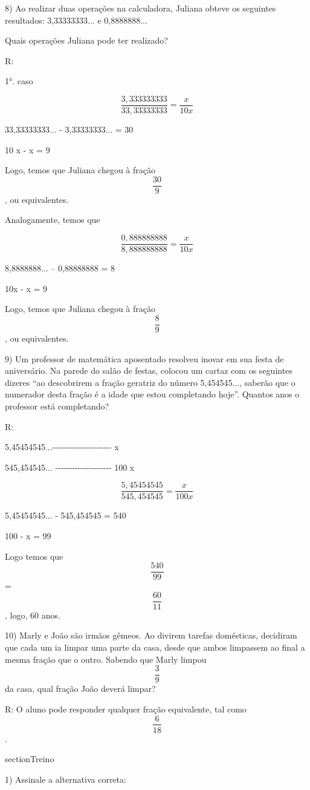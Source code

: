 8) Ao realizar duas operações na calculadora, Juliana obteve os
seguintes resultados: 3,33333333... e 0,8888888...

Quais operações Juliana pode ter realizado?

R:

1°. caso

\[\frac {3,333333333}{33,33333333} = \frac {x}{10x}\]

33,33333333... - 3,33333333... = 30

10 x - x = 9

Logo, temos que Juliana chegou à fração \[\frac{30}{9}\], ou
equivalentes.

Analogamente, temos que

\[\frac {0,888888888}{8,888888888} = \frac {x}{10x}\]

8,8888888... -- 0,88888888 = 8

10x - x = 9

Logo, temos que Juliana chegou à fração \[\frac{8}{9}\], ou
equivalentes.

9) Um professor de matemática aposentado resolveu inovar em sua festa de
aniversário. Na parede do salão de festas, colocou um cartaz com os
seguintes dizeres ``ao descobrirem a fração geratriz do número
5,454545..., saberão que o numerador desta fração é a idade que estou
completando hoje''. Quantos anos o professor está completando?

R:

5,45454545...-\/-\/-\/-\/-\/-\/-\/-\/-\/-\/-\/-\/-\/-\/-\/-\/-\/-\/-\/-\/-
x

545,454545... -\/-\/-\/-\/-\/-\/-\/-\/-\/-\/-\/-\/-\/-\/-\/-\/-\/-\/-\/-
100 x

\[\frac {5,45454545}{545,454545} = \frac {x}{100x}\]

5,45454545... - 545,454545 = 540

100 - x = 99

Logo temos que \[\frac{540}{99}\] = \[\frac{60}{11}\], logo, 60 anos.

10) Marly e João são irmãos gêmeos. Ao divirem tarefas domésticas,
decidiram que cada um ia limpar uma parte da casa, desde que ambos
limpassem ao final a mesma fração que o outro. Sabendo que Marly limpou
\[\frac{3}{9}\] da casa, qual fração João deverá limpar?

R: O aluno pode responder qualquer fração equivalente, tal como
\[\frac{6}{18}\].

section{Treino}

1) Assinale a alternativa correta:

